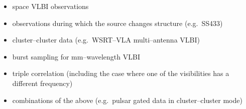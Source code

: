 \begin{itemize}

\item space VLBI observations

\item observations during which the source changes structure (e.g.\ SS433)

\item cluster--cluster data (e.g.\  WSRT--VLA multi--antenna VLBI)

\item burst sampling for mm--wavelength VLBI

\item triple correlation (including the case where one of the visibilities
has a different frequency)

\item combinations of the above (e.g.\ pulsar gated data in
  cluster--cluster mode)

\end{itemize}

